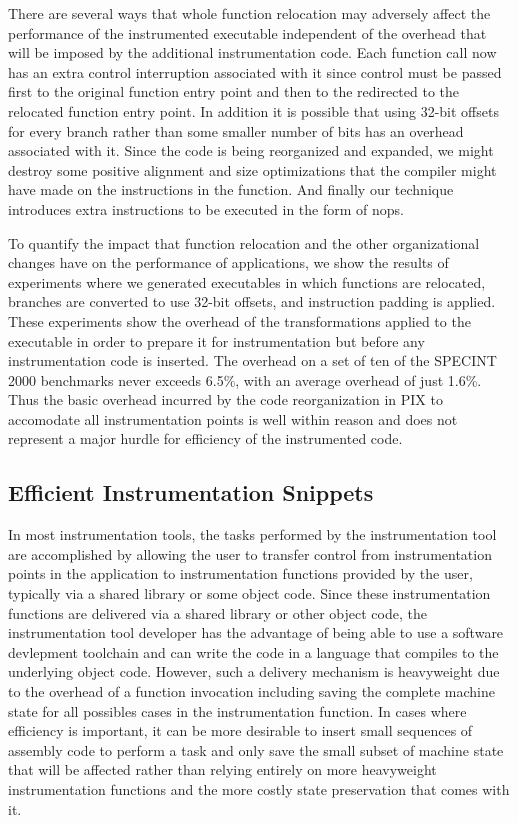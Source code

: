 There are several ways that whole function relocation may adversely affect 
the performance of the instrumented executable independent of the overhead
that will be imposed by the additional instrumentation code. Each function call
now has an extra control interruption associated with it since control must be passed first to the original function entry
point and then to the redirected to the relocated function entry point. In addition it is possible that using 32-bit offsets for every branch rather than
some smaller number of bits has an overhead associated with it. Since the code is being reorganized and expanded, 
we might destroy some positive alignment and size optimizations that the compiler might have made on the instructions in the
function. And finally our technique introduces extra instructions to be executed in the form of nops.

To quantify the impact that function relocation and the other organizational changes have
on the performance of applications, we show the results of experiments
where we generated executables in which functions are relocated, branches are converted to use 32-bit offsets, and 
instruction padding is applied. These experiments show the overhead of the transformations applied to the executable 
in order to prepare it for instrumentation but before any instrumentation code is inserted. The overhead on a set of ten of the 
SPECINT 2000 benchmarks never exceeds 6.5\%, with an average
overhead of just 1.6\%. Thus the basic overhead incurred by the code reorganization in PIX to accomodate all instrumentation points is
well within reason and does not represent a major hurdle for efficiency of the instrumented code.

\subsection{Efficient Instrumentation Snippets}

In most instrumentation tools, the tasks performed by the instrumentation tool are accomplished by allowing the user
to transfer control from instrumentation points in the application to instrumentation functions provided by the user, typically
via a shared library or some object code. Since these instrumentation functions are delivered via a shared library or other
object code, the instrumentation tool developer has the advantage of being able to use a software devlepment toolchain and can
write the code in a language that compiles to the underlying object code. However, such a delivery mechanism is heavyweight due to 
the overhead of a function invocation including saving the complete machine state for all possibles cases in the instrumentation function. In cases where
efficiency is important, it can be more desirable to insert small sequences of assembly code to perform a task and only
save the small subset of machine state that will be affected rather than relying entirely on more heavyweight instrumentation functions and the
more costly state preservation that comes with it.

